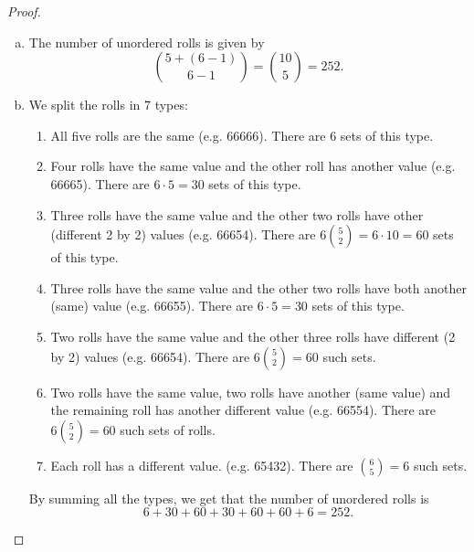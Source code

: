     \begin{proof}
        \hfill
        \begin{enumerate}[(a)]
            \item The number of unordered rolls is given by 
                \[
                    \binom{5 + (6 - 1)}{6 - 1} = \binom{10}{5} = 252
                .\] 

            \item We split the rolls in 7 types:
                \begin{enumerate}[(1)]
                    \item All five rolls are the same (e.g. 66666). There are 6 sets of this type.

                    \item Four rolls have the same value and the other roll has another value (e.g. 66665).
                        There are $6 \cdot 5 = 30$ sets of this type.
                    
                    \item Three rolls have the same value and the other two rolls have other (different 2 by 2)
                        values (e.g. 66654). There are  $6 \binom{5}{2} = 6 \cdot 10 = 60$ sets of this type.

                    \item Three rolls have the same value and the other two rolls have both another (same) value 
                        (e.g. 66655). There are $6 \cdot 5 = 30$ sets of this type.

                    \item Two rolls have the same value and the other three rolls have different (2 by 2) values
                        (e.g. 66654). There are $6 \binom{5}{2} = 60$ such sets.

                    \item Two rolls have the same value, two rolls have another (same value) and the 
                        remaining roll has another different value (e.g. 66554). 
                        There are $6 \binom{5}{2} = 60$ such sets of rolls.

                    \item Each roll has a different value. (e.g. 65432). There are $\binom{6}{5} = 6$ such sets.
                \end{enumerate}

            By summing all the types, we get that the number of unordered rolls is 
            \[
                6 + 30 + 60 + 30 + 60 + 60 + 6 = 252
            .\] 


\end{enumerate}
\end{proof}
